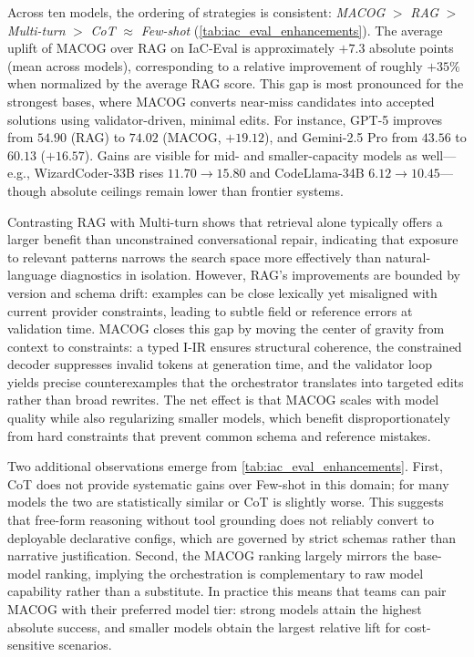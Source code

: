 \documentclass[acmsmall,screen,review,anonymous]{acmart}
\begin{document}
Across ten models, the ordering of strategies is consistent: \emph{MACOG} \(>\) \emph{RAG} \(>\) \emph{Multi-turn} \(>\) \emph{CoT} \(\approx\) \emph{Few-shot} (\autoref{tab:iac_eval_enhancements}). The average uplift of MACOG over RAG on IaC-Eval is approximately \(+7.3\) absolute points (mean across models), corresponding to a relative improvement of roughly \(+35\%\) when normalized by the average RAG score. This gap is most pronounced for the strongest bases, where MACOG converts near-miss candidates into accepted solutions using validator-driven, minimal edits. For instance, GPT-5 improves from \(54.90\) (RAG) to \(74.02\) (MACOG, \(+19.12\)), and Gemini-2.5 Pro from \(43.56\) to \(60.13\) (\(+16.57\)). Gains are visible for mid- and smaller-capacity models as well—e.g., WizardCoder-33B rises \(11.70 \rightarrow 15.80\) and CodeLlama-34B \(6.12 \rightarrow 10.45\)—though absolute ceilings remain lower than frontier systems.

Contrasting RAG with Multi-turn shows that retrieval alone typically offers a larger benefit than unconstrained conversational repair, indicating that exposure to relevant patterns narrows the search space more effectively than natural-language diagnostics in isolation. However, RAG’s improvements are bounded by version and schema drift: examples can be close lexically yet misaligned with current provider constraints, leading to subtle field or reference errors at validation time. MACOG closes this gap by moving the center of gravity from context to constraints: a typed I-IR ensures structural coherence, the constrained decoder suppresses invalid tokens at generation time, and the validator loop yields precise counterexamples that the orchestrator translates into targeted edits rather than broad rewrites. The net effect is that MACOG scales with model quality while also regularizing smaller models, which benefit disproportionately from hard constraints that prevent common schema and reference mistakes.

Two additional observations emerge from \autoref{tab:iac_eval_enhancements}. First, CoT does not provide systematic gains over Few-shot in this domain; for many models the two are statistically similar or CoT is slightly worse. This suggests that free-form reasoning without tool grounding does not reliably convert to deployable declarative configs, which are governed by strict schemas rather than narrative justification. Second, the MACOG ranking largely mirrors the base-model ranking, implying the orchestration is complementary to raw model capability rather than a substitute. In practice this means that teams can pair MACOG with their preferred model tier: strong models attain the highest absolute success, and smaller models obtain the largest relative lift for cost-sensitive scenarios.
\end{document}

